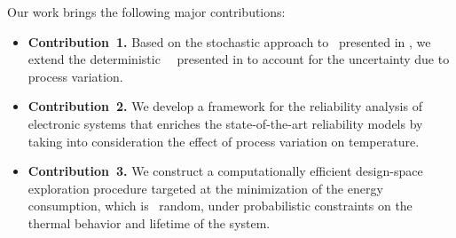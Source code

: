 Our work brings the following major contributions:
\begin{itemize}
  \item {\bfseries Contribution~1.} Based on the stochastic approach to \tta\ presented in \cite{ukhov2014}, we extend the deterministic \DSS\ \ta\ presented in \cite{ukhov2012} to account for the uncertainty due to process variation.
  \item {\bfseries Contribution~2.} We develop a framework for the reliability analysis of electronic systems that enriches the state-of-the-art reliability models by taking into consideration the effect of process variation on temperature.
  \item {\bfseries Contribution~3.} We construct a computationally efficient design-space exploration procedure targeted at the minimization of the energy consumption, which is \apriori\ random, under probabilistic constraints on the thermal behavior and lifetime of the system.
\end{itemize}
